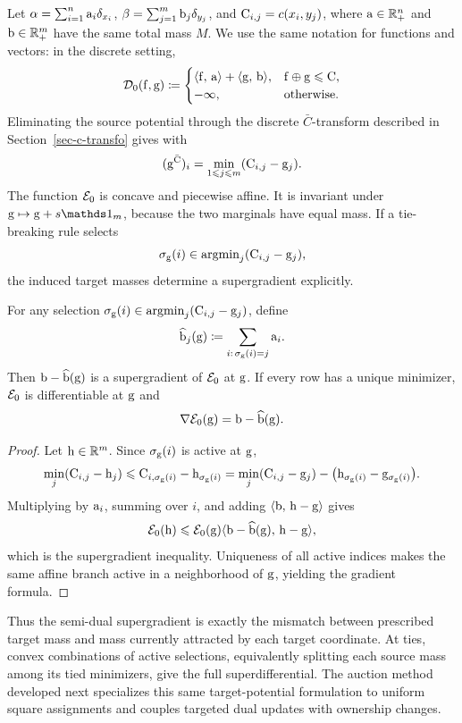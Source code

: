 Let $\alpha=\sum_{i=1}^n\mathrm{a}_i\delta_{x_i}$,
$\beta=\sum_{j=1}^m\mathrm{b}_j\delta_{y_j}$, and $\mathrm{C}_{i,j}=c(x_i,y_j)$,
where $\mathrm{a}\in\mathbb{R}_+^n$ and $\mathrm{b}\in\mathbb{R}_+^m$ have the same total mass $M$. We use the same notation for functions and vectors: in the discrete setting,
\[
	\mathcal{D}_0(\mathrm{f},\mathrm{g})
	\coloneqq
	\begin{cases}
		\langle \mathrm{f},\,\mathrm{a}\rangle+\langle \mathrm{g},\,\mathrm{b}\rangle,
		& \mathrm{f}\oplus\mathrm{g}\leqslant\mathrm{C},\\
		-\infty, & \text{otherwise}.
	\end{cases}
\]
Eliminating the source potential through the discrete $\bar C$-transform described in Section~\ref{sec-c-transfo} gives
with
\[
	(\mathrm{g}^{\bar{\mathrm{C}}})_i
	=
	\min_{1\leqslant j\leqslant m}(\mathrm{C}_{i,j}-\mathrm{g}_j).
\]
The function $\mathcal{E}_0$ is concave and piecewise affine. It is invariant under $\gD\mapsto\gD+s\ones_m$, because the two marginals have equal mass. If a tie-breaking rule selects
\[
	\sigma_{\mathrm{g}}(i)\in\operatorname{argmin}_j(\mathrm{C}_{i,j}-\mathrm{g}_j),
\]
the induced target masses determine a supergradient explicitly.

\begin{prop}\label{prop-discrete-semidual-supergradient}
	For any selection
	$\sigma_{\mathrm{g}}(i)\in\operatorname{argmin}_j(\mathrm{C}_{i,j}-\mathrm{g}_j)$, define
	\[
		\widehat{\mathrm{b}}_j(\mathrm{g})
		\coloneqq
		\sum_{i:\,\sigma_{\mathrm{g}}(i)=j}\mathrm{a}_i.
	\]
	Then $\mathrm{b}-\widehat{\mathrm{b}}(\mathrm{g})$ is a supergradient of $\mathcal{E}_0$ at $\mathrm{g}$. If every row has a unique minimizer, $\mathcal{E}_0$ is differentiable at $\mathrm{g}$ and
	\[
		\nabla\mathcal{E}_0(\mathrm{g})=\mathrm{b}-\widehat{\mathrm{b}}(\mathrm{g}).
	\]
\end{prop}
\begin{proof}
	Let $\mathrm{h}\in\mathbb{R}^m$. Since $\sigma_{\mathrm{g}}(i)$ is active at $\mathrm{g}$,
	\[
		\min_j(\mathrm{C}_{i,j}-\mathrm{h}_j)
		\leqslant
		\mathrm{C}_{i,\sigma_{\mathrm{g}}(i)}-\mathrm{h}_{\sigma_{\mathrm{g}}(i)}
		=
		\min_j(\mathrm{C}_{i,j}-\mathrm{g}_j)
		-\bigl(\mathrm{h}_{\sigma_{\mathrm{g}}(i)}-\mathrm{g}_{\sigma_{\mathrm{g}}(i)}\bigr).
	\]
	Multiplying by $\mathrm{a}_i$, summing over $i$, and adding
	$\langle \mathrm{b},\,\mathrm{h}-\mathrm{g}\rangle$ gives
	\[
		\mathcal{E}_0(\mathrm{h})
		\leqslant
		\mathcal{E}_0(\mathrm{g})
		\langle \mathrm{b}-\widehat{\mathrm{b}}(\mathrm{g}),\,\mathrm{h}-\mathrm{g}\rangle,
	\]
	which is the supergradient inequality. Uniqueness of all active indices makes the same affine branch active in a neighborhood of $\mathrm{g}$, yielding the gradient formula.
\end{proof}

Thus the semi-dual supergradient is exactly the mismatch between prescribed target mass and mass currently attracted by each target coordinate. At ties, convex combinations of active selections, equivalently splitting each source mass among its tied minimizers, give the full superdifferential. The auction method developed next specializes this same target-potential formulation to uniform square assignments and couples targeted dual updates with ownership changes.

